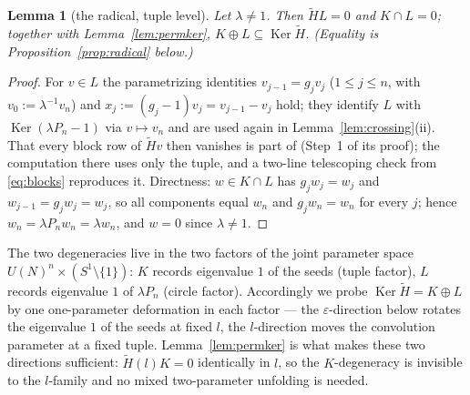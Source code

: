 \documentclass[11pt]{article}
\newtheorem{lemma}[theorem]{Lemma}
\theoremstyle{definition}
\newcommand{\Ht}{\widetilde H}
\newcommand{\Ker}{\operatorname{Ker}}
\begin{document}
\begin{lemma}[the radical, tuple level]\label{lem:radical}
Let $\lambda\neq1$. Then $\Ht L=0$ and $K\cap L=0$; together with
Lemma~\ref{lem:permker}, $K\oplus L\subseteq\Ker\Ht$. (Equality is
Proposition~\ref{prop:radical} below.)
\end{lemma}

\begin{proof}
For $v\in L$ the parametrizing identities $v_{j-1}=g_jv_j$
($1\le j\le n$, with $v_0:=\lambda^{-1}v_n$) and
$x_j:=(g_j-1)v_j=v_{j-1}-v_j$ hold; they identify $L$ with
$\Ker(\lambda P_n-1)$ via $v\mapsto v_n$ and are used again in
Lemma~\ref{lem:crossing}(ii). That every block row of $\Ht v$ then
vanishes is part of \cite[Thm.~9]{N-KLM} (Step~1 of its proof); the computation there uses only
the tuple, and a two-line telescoping check from \eqref{eq:blocks}
reproduces it. Directness: $w\in K\cap L$ has $g_jw_j=w_j$ and
$w_{j-1}=g_jw_j=w_j$, so all components equal $w_n$ and
$g_jw_n=w_n$ for every $j$; hence
$w_n=\lambda P_nw_n=\lambda w_n$, and $w=0$ since $\lambda\neq1$.
\end{proof}

The two degeneracies live in the two factors of the joint parameter
space $U(N)^{n}\times(S^{1}\setminus\{1\})$: $K$ records
eigenvalue $1$ of the seeds (tuple factor), $L$ records eigenvalue
$1$ of $\lambda P_n$ (circle factor). Accordingly we probe
$\Ker\Ht=K\oplus L$ by one one-parameter deformation in each
factor --- the $\varepsilon$-direction below rotates the eigenvalue
$1$ of the seeds at fixed $l$, the $l$-direction moves the
convolution parameter at a fixed tuple. Lemma~\ref{lem:permker} is
what makes these two directions sufficient: $\Ht(l)K=0$ identically
in $l$, so the $K$-degeneracy is invisible to the $l$-family and no
mixed two-parameter unfolding is needed.
\end{document}
